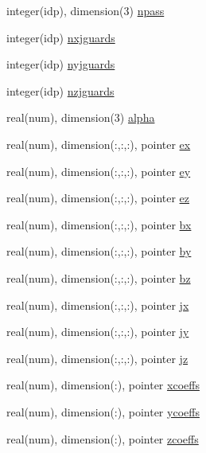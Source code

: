 \begin{DoxyCompactItemize}
\item 
integer(idp), dimension(3) \hyperlink{namespacefields_ab87cdb3a2fad3969d058285da9197868}{npass}
\item 
integer(idp) \hyperlink{namespacefields_a775a9360ab07f232c9c55bf737fa25e4}{nxjguards}
\item 
integer(idp) \hyperlink{namespacefields_a040a1f8e7a331db1b9d025819a7e9453}{nyjguards}
\item 
integer(idp) \hyperlink{namespacefields_ae8d3cd10ec1c6301ada4c9cad60c1125}{nzjguards}
\item 
real(num), dimension(3) \hyperlink{namespacefields_a123e475dfb74b9d51f0cefd3aa32f4ef}{alpha}
\item 
real(num), dimension(\+:,\+:,\+:), pointer \hyperlink{namespacefields_a4b459092bf44b6c1e18d38c5b67ffdd8}{ex}
\item 
real(num), dimension(\+:,\+:,\+:), pointer \hyperlink{namespacefields_a416c4dba2dc5fb0ac7cbeb6bdbaffc2c}{ey}
\item 
real(num), dimension(\+:,\+:,\+:), pointer \hyperlink{namespacefields_a0fa6f30ad153ef0e52f181d70e3b92e1}{ez}
\item 
real(num), dimension(\+:,\+:,\+:), pointer \hyperlink{namespacefields_ae5c4690c74e129bc786b6880e43e5263}{bx}
\item 
real(num), dimension(\+:,\+:,\+:), pointer \hyperlink{namespacefields_a945637961cd81816fb389b3aff1bcdc6}{by}
\item 
real(num), dimension(\+:,\+:,\+:), pointer \hyperlink{namespacefields_aaf0c4459b6c5caf1375fef4b33801e86}{bz}
\item 
real(num), dimension(\+:,\+:,\+:), pointer \hyperlink{namespacefields_ab4aadb2986a77b2c2546cee63c380fca}{jx}
\item 
real(num), dimension(\+:,\+:,\+:), pointer \hyperlink{namespacefields_aacf6032b8f949c35388351665b007c93}{jy}
\item 
real(num), dimension(\+:,\+:,\+:), pointer \hyperlink{namespacefields_ad1f49be91f74095a76edaa8ff8c26c8c}{jz}
\item 
real(num), dimension(\+:), pointer \hyperlink{namespacefields_af385d7c4d2f11c483c899d7f4aa8b3ca}{xcoeffs}
\item 
real(num), dimension(\+:), pointer \hyperlink{namespacefields_a13ae96bfb25ee0698529585220416d5e}{ycoeffs}
\item 
real(num), dimension(\+:), pointer \hyperlink{namespacefields_aab4aa30b16b003222aa946420ff709d6}{zcoeffs}
\end{DoxyCompactItemize}


